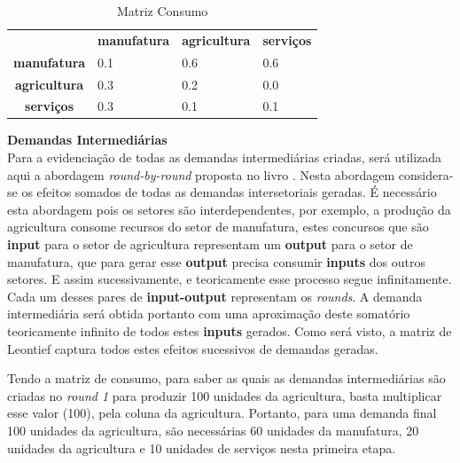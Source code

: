 \documentclass[a4paper, 12pt]{article}
\begin{document}
\begin{table}[]
\begin{tabular}{clll}
\multicolumn{1}{r}{\textbf{}} & \multicolumn{1}{r}{\textbf{manufatura}} & \multicolumn{1}{r}{\textbf{agricultura}} & \multicolumn{1}{r}{\textbf{serviços}} \\
\textbf{manufatura}           & 0.1                                     & 0.6                                      & 0.6                                   \\
\textbf{agricultura}          & 0.3                                     & 0.2                                      & 0.0                                   \\
\textbf{serviços}             & 0.3                                     & 0.1                                      & 0.1    

\end{tabular}
\caption{Matriz Consumo}
\label{Matriz_Consumo_1a}
\end{table}

\textbf{Demandas Intermediárias}\\

Para a evidenciação de todas as demandas intermediárias criadas, será utilizada aqui a abordagem \textit{round-by-round} proposta no livro \citep{livro_miller}. Nesta abordagem considera-se os efeitos somados de todas as demandas intersetoriais geradas. É necessário esta abordagem pois os setores são interdependentes, por exemplo, a produção da agricultura consome recursos do setor de manufatura, estes concursos que são \textbf{input} para o setor de agricultura representam um \textbf{output} para o setor de manufatura, que para gerar esse \textbf{output} precisa consumir \textbf{inputs} dos outros setores. E assim sucessivamente, e teoricamente esse processo segue infinitamente. Cada um desses pares de \textbf{input-output} representam os \textit{rounds}. A demanda intermediária será obtida portanto com uma aproximação deste somatório teoricamente infinito de todos estes \textbf{inputs} gerados. Como será visto, a matriz de Leontief captura todos estes efeitos sucessivos de demandas geradas.

Tendo a matriz de consumo, para saber as quais as demandas intermediárias são criadas no \textit{round 1} para produzir 100 unidades da agricultura, basta multiplicar esse valor (100), pela coluna da agricultura.
Portanto, para uma demanda final 100 unidades da agricultura, são necessárias 60 unidades da manufatura, 20 unidades da agricultura e 10 unidades de serviços nesta primeira etapa. 
\end{document}

